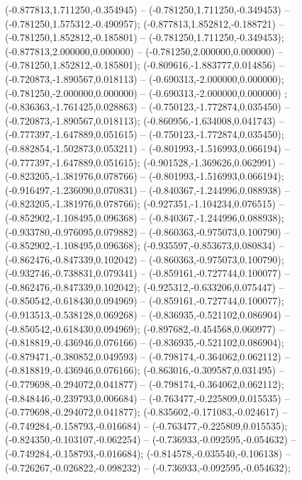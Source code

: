  (-0.877813,1.711250,-0.354945) -- (-0.781250,1.711250,-0.349453) -- (-0.781250,1.575312,-0.490957);
 (-0.877813,1.852812,-0.188721) -- (-0.781250,1.852812,-0.185801) -- (-0.781250,1.711250,-0.349453);
 (-0.877813,2.000000,0.000000) -- (-0.781250,2.000000,0.000000) -- (-0.781250,1.852812,-0.185801);
 (-0.809616,-1.883777,0.014856) -- (-0.720873,-1.890567,0.018113) -- (-0.690313,-2.000000,0.000000);
 (-0.781250,-2.000000,0.000000) -- (-0.690313,-2.000000,0.000000) ;
 (-0.836363,-1.761425,0.028863) -- (-0.750123,-1.772874,0.035450) -- (-0.720873,-1.890567,0.018113);
 (-0.860956,-1.634008,0.041743) -- (-0.777397,-1.647889,0.051615) -- (-0.750123,-1.772874,0.035450);
 (-0.882854,-1.502873,0.053211) -- (-0.801993,-1.516993,0.066194) -- (-0.777397,-1.647889,0.051615);
 (-0.901528,-1.369626,0.062991) -- (-0.823205,-1.381976,0.078766) -- (-0.801993,-1.516993,0.066194);
 (-0.916497,-1.236090,0.070831) -- (-0.840367,-1.244996,0.088938) -- (-0.823205,-1.381976,0.078766);
 (-0.927351,-1.104234,0.076515) -- (-0.852902,-1.108495,0.096368) -- (-0.840367,-1.244996,0.088938);
 (-0.933780,-0.976095,0.079882) -- (-0.860363,-0.975073,0.100790) -- (-0.852902,-1.108495,0.096368);
 (-0.935597,-0.853673,0.080834) -- (-0.862476,-0.847339,0.102042) -- (-0.860363,-0.975073,0.100790);
 (-0.932746,-0.738831,0.079341) -- (-0.859161,-0.727744,0.100077) -- (-0.862476,-0.847339,0.102042);
 (-0.925312,-0.633206,0.075447) -- (-0.850542,-0.618430,0.094969) -- (-0.859161,-0.727744,0.100077);
 (-0.913513,-0.538128,0.069268) -- (-0.836935,-0.521102,0.086904) -- (-0.850542,-0.618430,0.094969);
 (-0.897682,-0.454568,0.060977) -- (-0.818819,-0.436946,0.076166) -- (-0.836935,-0.521102,0.086904);
 (-0.879471,-0.380852,0.049593) -- (-0.798174,-0.364062,0.062112) -- (-0.818819,-0.436946,0.076166);
 (-0.863016,-0.309587,0.031495) -- (-0.779698,-0.294072,0.041877) -- (-0.798174,-0.364062,0.062112);
 (-0.848446,-0.239793,0.006684) -- (-0.763477,-0.225809,0.015535) -- (-0.779698,-0.294072,0.041877);
 (-0.835602,-0.171083,-0.024617) -- (-0.749284,-0.158793,-0.016684) -- (-0.763477,-0.225809,0.015535);
 (-0.824350,-0.103107,-0.062254) -- (-0.736933,-0.092595,-0.054632) -- (-0.749284,-0.158793,-0.016684);
 (-0.814578,-0.035540,-0.106138) -- (-0.726267,-0.026822,-0.098232) -- (-0.736933,-0.092595,-0.054632);

